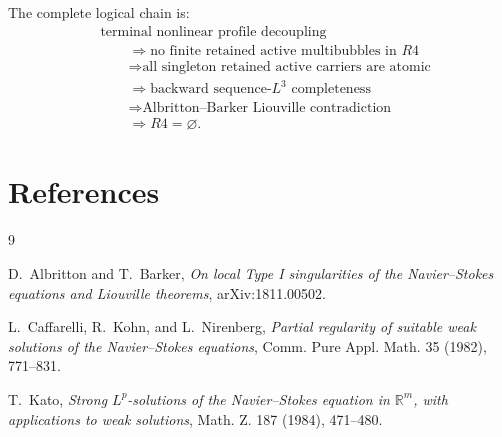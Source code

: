 \documentclass[11pt]{article}
\numberwithin{equation}{section}
\newcommand{\R}{\mathbb R}
\begin{document}
The complete logical chain is:
\[
\begin{aligned}
  &\text{terminal nonlinear profile decoupling} \\
  &\qquad\Longrightarrow
  \text{no finite retained active multibubbles in }R4 \\
  &\qquad\Longrightarrow
  \text{all singleton retained active carriers are atomic} \\
  &\qquad\Longrightarrow
  \text{backward sequence-}L^3\text{ completeness} \\
  &\qquad\Longrightarrow
  \text{Albritton--Barker Liouville contradiction} \\
  &\qquad\Longrightarrow
  R4=\varnothing.
\end{aligned}
\]

\section*{References}

\begin{thebibliography}{9}

D.~Albritton and T.~Barker,
\emph{On local Type I singularities of the Navier--Stokes equations and
Liouville theorems},
arXiv:1811.00502.

L.~Caffarelli, R.~Kohn, and L.~Nirenberg,
\emph{Partial regularity of suitable weak solutions of the Navier--Stokes equations},
Comm. Pure Appl. Math. 35 (1982), 771--831.

T.~Kato,
\emph{Strong \(L^p\)-solutions of the Navier--Stokes equation in \(\R^m\), with applications to weak solutions},
Math. Z. 187 (1984), 471--480.

\end{thebibliography}
\end{document}
